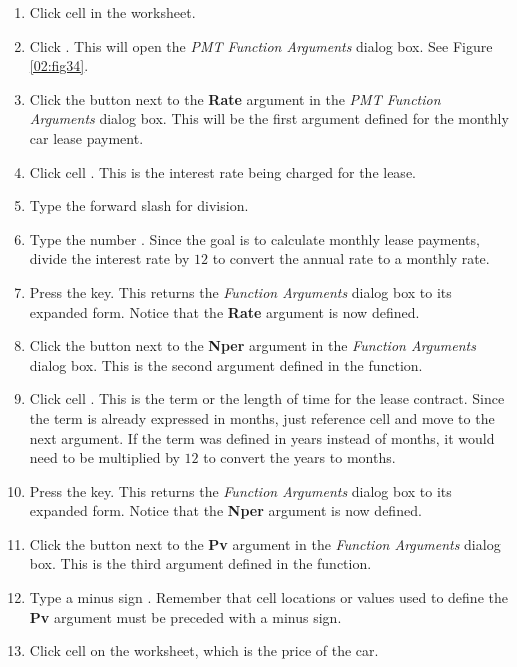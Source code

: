 \begin{enumerate}
	\item Click cell  in the  worksheet.
	\item Click . This will open the \textit{PMT Function Arguments} dialog box. See Figure \ref{02:fig34}.
	\item Click the  button next to the \textbf{Rate} argument in the \textit{PMT Function Arguments} dialog box. This will be the first argument defined for the monthly car lease payment.
	\item Click cell . This is the interest rate being charged for the lease.
	\item Type the forward slash \fmtTyping{/} for division.
	\item Type the number . Since the goal is to calculate monthly lease payments, divide the interest rate by $ 12 $ to convert the annual rate to a monthly rate.
	\item Press the  key. This returns the \textit{Function Arguments} dialog box to its expanded form. Notice that the \textbf{Rate} argument is now defined.
	\item Click the  button next to the \textbf{Nper} argument in the \textit{Function Arguments} dialog box. This is the second argument defined in the function.
	\item Click cell . This is the term or the length of time for the lease contract. Since the term is already expressed in months, just reference cell  and move to the next argument. If the term was defined in years instead of months, it would need to be multiplied by $ 12 $ to convert the years to months.
	\item Press the  key. This returns the \textit{Function Arguments} dialog box to its expanded form. Notice that the \textbf{Nper} argument is now defined.
	\item Click the  button next to the \textbf{Pv} argument in the \textit{Function Arguments} dialog box. This is the third argument defined in the function.
	\item Type a minus sign \fmtTyping{-}. Remember that cell locations or values used to define the \textbf{Pv} argument must be preceded with a minus sign.
	\item Click cell  on the worksheet, which is the price of the car.

\end{enumerate}
